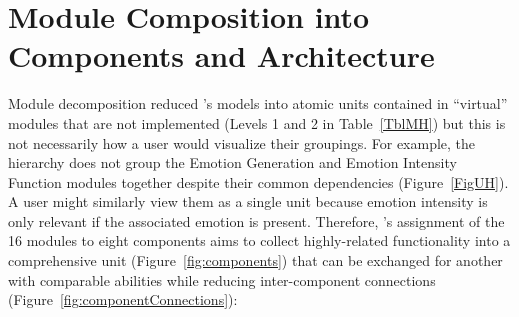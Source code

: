 \section{Module Composition into Components and Architecture}
Module decomposition reduced \progname{}'s models into atomic units contained
in ``virtual'' modules that are not implemented (Levels 1 and 2 in
Table~\ref{TblMH}) but this is not necessarily how a user would visualize their
groupings. For example, the hierarchy does not group the Emotion Generation and
Emotion Intensity Function modules together despite their common dependencies
(Figure~\ref{FigUH}). A user might similarly view them as a single unit because
emotion intensity is only relevant if the associated emotion is present.
Therefore, \progname{}'s assignment of the 16 modules to eight components aims
to collect highly-related functionality into a comprehensive unit
(Figure~\ref{fig:components}) that can be exchanged for another with comparable
abilities while reducing inter-component connections
(Figure~\ref{fig:componentConnections}):
